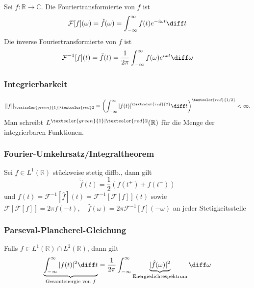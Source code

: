 \begin{emphbox}
    Sei $f: \mathbb R\rightarrow\mathbb C$. Die Fouriertransformierte von $f$ ist
    \begin{equation*}
        \mathcal F[f](\omega) = \hat f(\omega)=\int_{-\infty}^\infty f(t)e^{-i\omega t}\diff t
    \end{equation*}
    Die inverse Fouriertransformierte von $f$ ist
    \begin{equation*}
        \mathcal F^{-1}[f](t) = \check f(t)=\frac{1}{2\pi}\int_{-\infty}^\infty f(\omega)e^{i\omega t}\diff \omega
    \end{equation*}
\end{emphbox}

\begin{sectionbox}
    \subsubsection{\textcolor{green}{}\textbar\textcolor{red}{} Integrierbarkeit}
    \begin{equation*}
        ||f||_{\textcolor{green}{1}\vert\textcolor{red}2}=\left(\int_{-\infty}^{\infty}|f(t)|^{\textcolor{red}{2}}\diff t\right)^{\textcolor{red}{1/2}} < \infty.
    \end{equation*}
    Man schreibt $L^{\textcolor{green}{1}\vert\textcolor{red}2}(\mathbb R)$ für die Menge der \textcolor{green}{}\textbar\textcolor{red}{} integrierbaren Funktionen.
\end{sectionbox}

\begin{sectionbox}
    \subsubsection{Fourier-Umkehrsatz/Integraltheorem}
    Sei $f\in L^1(\mathbb R)$ stückweise stetig diffb., dann gilt \begin{equation*}
        \check{\hat f}(t) = \frac{1}{2}(f(t^+) + f(t^-))
    \end{equation*} und $f(t) = \mathcal F^{-1}[\hat f](t)=\mathcal F^{-1}[\mathcal F [f]](t)$ sowie \\
    $\mathcal F[\mathcal F[f]]=2\pi f(-t), \quad \hat f(\omega) = 2\pi \mathcal F^{-1}[f](-\omega)$ an jeder Stetigkeitsstelle
\end{sectionbox}

\begin{sectionbox}
    \subsubsection{Parseval-Plancherel-Gleichung}
    Falls $f\in L^1(\mathbb R) \cap L^2(\mathbb R)$, dann gilt
    \begin{equation*}
        \underbrace{\int_{-\infty}^{\infty}|f(t)|^2\diff t}_{\text{Gesamtenergie von } f} = \frac{1}{2\pi}\int_{-\infty}^{\infty}\underbrace{|\hat f(\omega)|^2}_{\text{Energiedichtespektrum}} \diff \omega
    \end{equation*}
\end{sectionbox}

